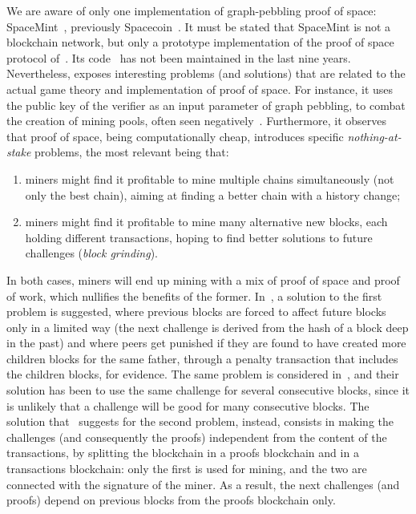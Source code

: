 We are aware of only one implementation of graph-pebbling proof of space:
SpaceMint~\cite{ParkKFGAP18}, previously Spacecoin~\cite{ParkPAFG15}.
It must be stated that SpaceMint is not a blockchain network,
but only a prototype implementation of the proof of space protocol of~\cite{DziembowskiFKP15}.
Its code~\cite{SpaceMintCode} has not been maintained in the last nine years.
Nevertheless, \cite{ParkKFGAP18} exposes interesting problems (and solutions)
that are related to the actual game theory and implementation of proof of space.
For instance, it uses the public key of the verifier as an input parameter
of graph pebbling, to combat the creation of mining pools, often seen
negatively~\cite{MillerKKS15}.
Furthermore, it observes that proof of space, being computationally cheap, introduces
specific \emph{nothing-at-stake} problems, the most relevant being that:
%
\begin{enumerate}
\item miners might find it profitable to mine multiple chains simultaneously (not only the best chain),
  aiming at finding a better chain with a history change;
\item miners might find it profitable to mine many alternative new blocks, each holding
  different transactions, hoping to find better solutions to future challenges (\emph{block grinding}).
\end{enumerate}
%
In both cases, miners will end up mining with a mix of proof of space and proof of work,
which nullifies the benefits of the former.
In~\cite{ParkKFGAP18}, a solution to the first problem is suggested, where
previous blocks are forced to affect future blocks only in a limited way
(the next challenge is derived from the hash of a block deep in the past)
and where peers get punished if they are found to have
created more children blocks for the same father, through a penalty transaction that
includes the children blocks, for evidence.
The same problem is considered in~\cite{CohenP19}, and their solution has been
to use the same challenge for several consecutive blocks, since it is
unlikely that a challenge will be good for many consecutive blocks.
The solution that~\cite{ParkKFGAP18} suggests
for the second problem, instead, consists in making the challenges
(and consequently the proofs) independent from the content of the transactions, by splitting the
blockchain in a proofs blockchain and in a transactions blockchain: only the first is used for mining,
and the two are connected with the signature of the miner.
As a result, the next challenges (and proofs) depend on previous blocks from the proofs blockchain only.
